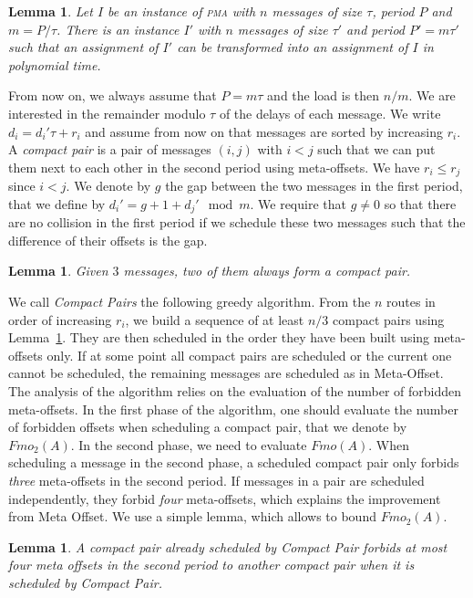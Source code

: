 \documentclass[10pt, conference, letterpaper]{algotel}
\newtheorem{lemma}[theorem]{Lemma}
\newcommand\pma{\textsc{pma}\xspace}
\begin{document}
\begin{lemma}
Let $I$ be an instance of \pma with $n$ messages of size $\tau$, period $P$ and $m = P / \tau$. There is an instance $I'$ with $n$ messages of size $\tau'$ and period $P'= m\tau'$ such that an assignment of $I'$ can be transformed into an assignment of $I$ in polynomial time.
\end{lemma}

From now on, we always assume that $P = m\tau$ and the load is then $n/m$.
We are interested in the remainder modulo $\tau$ of the delays of each message.
We write $d_i = d_{i}'\tau + r_i$ and assume from now on that messages are sorted by increasing $r_i$.
A \emph{compact pair} is a pair of messages $(i,j)$ with $i < j$ such that we can put them next to each other in the second period using meta-offsets.
We have $r_i \leq r_j$ since $i < j$. We denote by $g$ the gap between the two messages in the first period, that we define by $d_{i}' = g + 1 + d_{j}' \mod m$. We require that $g \neq 0$ so that there are no collision in the first period if we schedule these two messages such that the difference of their offsets is the gap. 


\begin{lemma}\label{lemma:pair_find}
Given $3$ messages, two of them always form a compact pair. 
\end{lemma}

We call \emph{Compact Pairs} the following greedy algorithm. From the $n$ routes in order
of increasing $r_i$, we build a sequence of at least $n/3$ compact pairs using Lemma~\ref{lemma:pair_find}. They are then scheduled in the order they have been built using meta-offsets only. If at some point all compact pairs are scheduled or the current one cannot be scheduled, the remaining messages are scheduled as in Meta-Offset. The analysis of the algorithm relies on the evaluation of the number of forbidden meta-offsets. In the first phase of the algorithm, one should evaluate the number of forbidden offsets when scheduling a compact pair, that we denote by $Fmo_2(A)$. In the second phase, we need to evaluate $Fmo(A)$. When scheduling a message in the second phase, a scheduled compact pair only forbids \emph{three} meta-offsets in the second period. If messages in a pair are scheduled independently, they forbid \emph{four} meta-offsets, which explains the improvement from Meta Offset. We use a simple lemma, which allows to bound $Fmo_2(A)$.

\begin{lemma}\label{lemma:pair_forbid}
A compact pair already scheduled by Compact Pair forbids at most four meta offsets in the second period to another compact pair when it is scheduled by Compact Pair.
\end{lemma}
\end{document}

